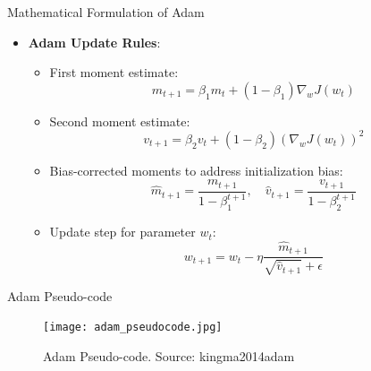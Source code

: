 \documentclass[serif, aspectratio=169]{beamer}
\begin{document}
\begin{frame}{Mathematical Formulation of Adam}
    \begin{itemize}
        \item \textbf{Adam Update Rules}:
        \begin{itemize}
            \item First moment estimate:
            \[
            m_{t+1} = \beta_1 m_t + (1 - \beta_1) \nabla_w J(w_t)
            \]
            \item Second moment estimate:
            \[
            v_{t+1} = \beta_2 v_t + (1 - \beta_2) (\nabla_w J(w_t))^2
            \]
            \item Bias-corrected moments to address initialization bias:
            \[
            \hat{m}_{t+1} = \frac{m_{t+1}}{1 - \beta_1^{t+1}}, \quad 
            \hat{v}_{t+1} = \frac{v_{t+1}}{1 - \beta_2^{t+1}}
            \]
            \item Update step for parameter \( w_t \):
            \[
            w_{t+1} = w_t - \eta \frac{\hat{m}_{t+1}}{\sqrt{\hat{v}_{t+1}} + \epsilon}
            \]
        \end{itemize}
    \end{itemize}
\end{frame}

\begin{frame}{Adam Pseudo-code}
    \begin{figure}
        \centering
        \texttt{[image: adam\_pseudocode.jpg]}
        \caption{Adam Pseudo-code. Source: kingma2014adam}

    \end{figure}
\end{frame}
\end{document}
